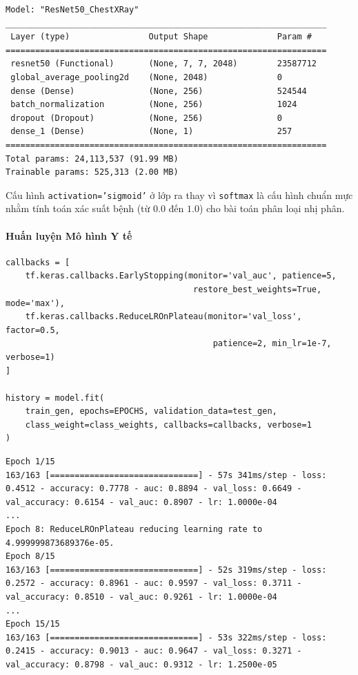 \begin{lstlisting}[style=consoleoutput, caption={Output: Tóm tắt thông số cấu trúc}]
Model: "ResNet50_ChestXRay"
_________________________________________________________________
 Layer (type)                Output Shape              Param #   
=================================================================
 resnet50 (Functional)       (None, 7, 7, 2048)        23587712  
 global_average_pooling2d    (None, 2048)              0         
 dense (Dense)               (None, 256)               524544    
 batch_normalization         (None, 256)               1024      
 dropout (Dropout)           (None, 256)               0         
 dense_1 (Dense)             (None, 1)                 257       
=================================================================
Total params: 24,113,537 (91.99 MB)
Trainable params: 525,313 (2.00 MB)
\end{lstlisting}

Cấu hình \texttt{activation='sigmoid'} ở lớp ra thay vì \texttt{softmax} là cấu hình chuẩn mực nhằm tính toán xác suất bệnh (từ $0.0$ đến $1.0$) cho bài toán phân loại nhị phân.

\paragraph{Huấn luyện Mô hình Y tế} \hfill\mbox{}

\begin{lstlisting}[style=pythoncode, caption={Quá trình học tích hợp giám sát tiêu chí AUC}]
callbacks = [
    tf.keras.callbacks.EarlyStopping(monitor='val_auc', patience=5,
                                      restore_best_weights=True, mode='max'),
    tf.keras.callbacks.ReduceLROnPlateau(monitor='val_loss', factor=0.5,
                                          patience=2, min_lr=1e-7, verbose=1)
]

history = model.fit(
    train_gen, epochs=EPOCHS, validation_data=test_gen,
    class_weight=class_weights, callbacks=callbacks, verbose=1
)
\end{lstlisting}

\begin{lstlisting}[style=consoleoutput, caption={Output: Log theo dõi trong quá trình Epochs}]
Epoch 1/15
163/163 [==============================] - 57s 341ms/step - loss: 0.4512 - accuracy: 0.7778 - auc: 0.8894 - val_loss: 0.6649 - val_accuracy: 0.6154 - val_auc: 0.8907 - lr: 1.0000e-04
...
Epoch 8: ReduceLROnPlateau reducing learning rate to 4.999999873689376e-05.
Epoch 8/15
163/163 [==============================] - 52s 319ms/step - loss: 0.2572 - accuracy: 0.8961 - auc: 0.9597 - val_loss: 0.3711 - val_accuracy: 0.8510 - val_auc: 0.9261 - lr: 1.0000e-04
...
Epoch 15/15
163/163 [==============================] - 53s 322ms/step - loss: 0.2415 - accuracy: 0.9013 - auc: 0.9647 - val_loss: 0.3271 - val_accuracy: 0.8798 - val_auc: 0.9312 - lr: 1.2500e-05
\end{lstlisting}

